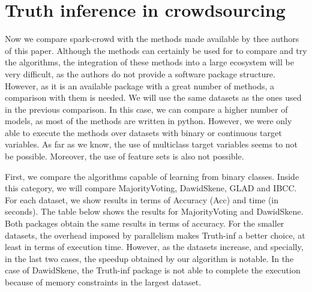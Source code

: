 \documentclass[letterpaper,10pt,english]{sphinxmanual}
\begin{document}
\section{Truth inference in crowdsourcing}
\label{\detokenize{package/other:id2}}
Now we compare spark-crowd with the methods made available by thee authors of this paper. Although the methods
can certainly be used for to compare and try the algorithms, the integration of these
methods into a large ecosystem will be very difficult, as the authors do not provide
a software package structure. However, as it is an available package with a great number
of methods, a comparison with them is needed. We will use the same datasets
as the ones used in the previous comparison. In this case, we can compare a higher
number of models, as most of the methods are written in python. However, we were only able
to execute the methods over datasets with binary or continuous target variables. As far as we
know, the use of multiclass target variables seems to not be possible. Moreover, the use of
feature sets is also not possible. 

First, we compare the algorithms capable of learning from binary classes.
Inside this category, we will compare MajorityVoting, DawidSkene, GLAD and IBCC. For each dataset, we show
results in terms of Accuracy (Acc) and time (in seconds). The table below shows the results for
MajorityVoting and DawidSkene. Both packages obtain the same results in terms of
accuracy. For the smaller datasets, the overhead imposed by parallelism makes Truth-inf a better choice,
at least in terms of execution time. However, as the datasets increase, and specially, in the last two
cases, the speedup obtained by our algorithm is notable. In the case of DawidSkene, the Truth-inf
package is not able to complete the execution because of memory constraints in the largest dataset.
\end{document}
